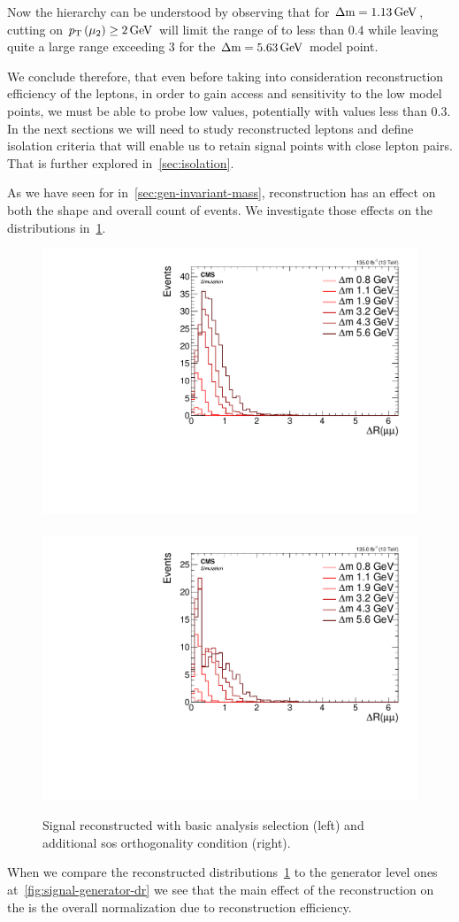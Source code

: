 Now the hierarchy can be understood by observing that for $\Delta\mathrm{m}=1.13\,\text{Ge\hspace{-.08em}V}$, cutting on $p_{\mathrm{T}}\left(\mu_2\right)\geq 2\,\text{Ge\hspace{-.08em}V}$ will limit the range of \drmm to less than $0.4$ while leaving quite a large range exceeding 3 for the $\Delta\mathrm{m}=5.63\,\text{Ge\hspace{-.08em}V}$ model point.

We conclude therefore, that even before taking into consideration reconstruction efficiency of the leptons, in order to gain access and sensitivity to the low \dm model points, we must be able to probe low \drll values, potentially with values less than 0.3. In the next sections we will need to study reconstructed leptons and define isolation criteria that will enable us to retain signal points with close lepton pairs. That is further explored in~\ref{sec:isolation}.

As we have seen for \mmumu in~\ref{sec:gen-invariant-mass}, reconstruction has an effect on both the shape and overall count of events. We investigate those effects on the \drmm distributions in~\ref{fig:reco-signal-dr}.

\begin{figure}[!htb]
\centering
\includegraphics[width=0.48\linewidth]{plots/signal_muons/none_deltaRCorrJetNoMultIso10Dr0.6.pdf} \,
\includegraphics[width=0.48\linewidth]{plots/signal_muons/none_deltaRCorrJetNoMultIso10Dr0.6_orth.pdf}  \\
\caption[Signal reconstructed \drmm]{ Signal reconstructed \drmm with basic analysis selection (left) and additional \gls{sos} orthogonality condition (right).}
\label{fig:reco-signal-dr}
\end{figure}

When we compare the reconstructed \drmm distributions~\ref{fig:reco-signal-dr} to the generator level ones at~\ref{fig:signal-generator-dr} we see that the main effect of the reconstruction on the \drmm is the overall normalization due to reconstruction efficiency.

